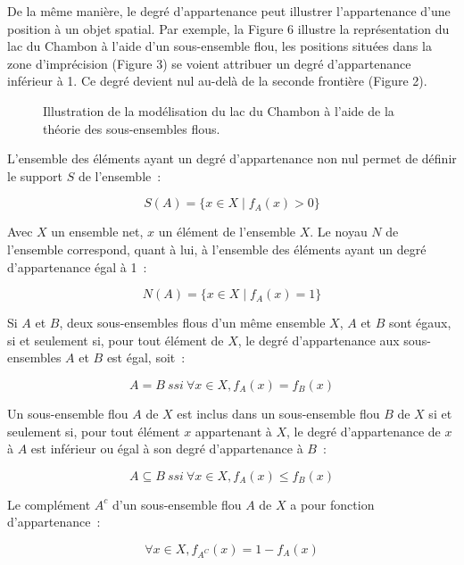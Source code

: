 De la même manière, le degré d’appartenance peut illustrer
l’appartenance d’une position à un objet spatial. Par exemple, la
Figure 6 illustre la représentation du lac du Chambon à l’aide d’un
sous-ensemble flou, les positions situées dans la zone d’imprécision
(Figure 3) se voient attribuer un degré d’appartenance inférieur à
1. Ce degré devient nul au-delà de la seconde frontière (Figure 2).

\begin{figure}
  \centering
  \caption{Illustration de la modélisation du lac du Chambon à l’aide
    de la théorie des sous-ensembles flous.}
  \label{fig:champ_flou}
\end{figure}

L’ensemble des éléments ayant un degré d’appartenance non nul permet
de définir le support $S$ de l’ensemble :

\begin{equation}
  S(A) = \{x ∈ X \mid f_A(x) > 0\}
\end{equation}

Avec $X$ un ensemble net, $x$ un élément de l’ensemble $X$. Le noyau
$N$ de l’ensemble correspond, quant à lui, à l’ensemble des éléments
ayant un degré d’appartenance égal à 1 :

\begin{equation}
  N(A) = \{x ∈ X \mid f_A(x) = 1\}
\end{equation}

Si $A$ et $B$, deux sous-ensembles flous d’un même ensemble $X$, $A$
et $B$ sont égaux, si et seulement si, pour tout élément de $X$, le
degré d’appartenance aux sous-ensembles $A$ et $B$ est égal, soit :

\begin{equation}
A = B\ ssi\ ∀x ∈ X, f_A(x) = f_B(x)
\end{equation}

Un sous-ensemble flou $A$ de $X$ est inclus dans un sous-ensemble flou
$B$ de $X$ si et seulement si, pour tout élément $x$ appartenant à
$X$, le degré d’appartenance de $x$ à $A$ est inférieur ou égal à son
degré d’appartenance à $B$ :

\begin{equation}
A ⊆ B\ ssi\ ∀x ∈ X, f_A(x) ≤ f_B(x)
\end{equation}

Le complément $A^c$ d’un sous-ensemble flou $A$ de $X$ a pour fonction
d’appartenance :

\begin{equation}
∀x ∈ X, f_{A^C}(x) = 1 − f_A(x)
\end{equation}

